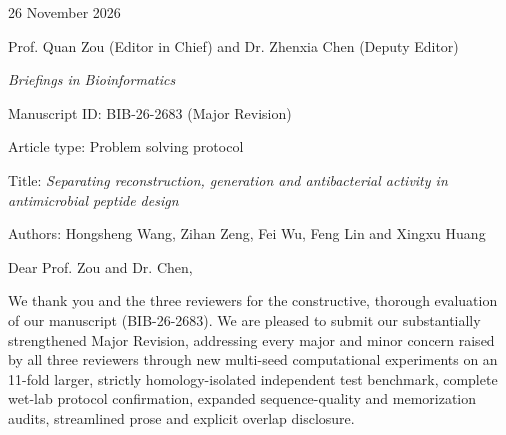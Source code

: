 \documentclass[10pt,a4paper]{article}
\begin{document}
26 November 2026\par
Prof. Quan Zou (Editor in Chief) and Dr. Zhenxia Chen (Deputy Editor)\par
\textit{Briefings in Bioinformatics}\par
Manuscript ID: BIB-26-2683 (Major Revision)\par
Article type: Problem solving protocol\par
Title: \textit{Separating reconstruction, generation and antibacterial activity in antimicrobial peptide design}\par
Authors: Hongsheng Wang, Zihan Zeng, Fei Wu, Feng Lin and Xingxu Huang

Dear Prof. Zou and Dr. Chen,

We thank you and the three reviewers for the constructive, thorough evaluation of our manuscript (BIB-26-2683). We are pleased to submit our substantially strengthened Major Revision, addressing every major and minor concern raised by all three reviewers through new multi-seed computational experiments on an 11-fold larger, strictly homology-isolated independent test benchmark, complete wet-lab protocol confirmation, expanded sequence-quality and memorization audits, streamlined prose and explicit overlap disclosure.
\end{document}
